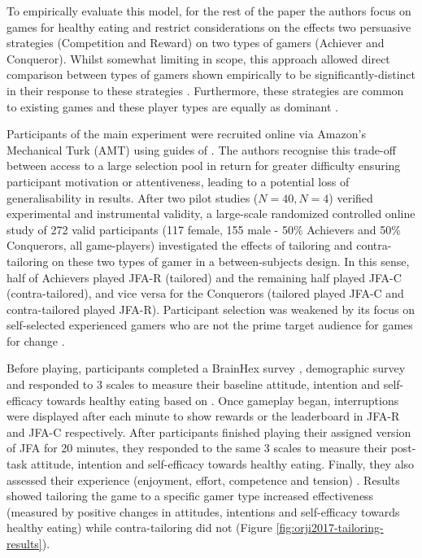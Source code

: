 \documentclass[11pt]{article}
\begin{document}
To empirically evaluate this model, for the rest of the paper the authors focus on games for healthy eating and restrict considerations on the effects two persuasive strategies (Competition and Reward) on two types of gamers (Achiever and Conqueror). Whilst somewhat limiting in scope, this approach allowed direct comparison between types of gamers shown empirically to be significantly-distinct in their response to these strategies \citep{orji2013a}. Furthermore, these strategies are common to existing games \citep{bell2006} and these player types are equally as dominant \citep{bartle1996}. 

Participants of the main experiment were recruited online via Amazon’s Mechanical Turk (AMT) using guides of \citet{mason2012}. The authors recognise this trade-off between access to a large selection pool in return for greater difficulty ensuring participant motivation or attentiveness, leading to a potential loss of generalisability in results. After two pilot studies ($N=40, N=4$) verified experimental and instrumental validity, a large-scale randomized controlled online study of 272 valid participants (117 female, 155 male - 50\% Achievers and 50\% Conquerors, all game-players) investigated the effects of tailoring and contra-tailoring on these two types of gamer in a between-subjects design. In this sense, half of Achievers played JFA-R (tailored) and the remaining half played JFA-C (contra-tailored), and vice versa for the Conquerors (tailored played JFA-C and contra-tailored played JFA-R). Participant selection was weakened by its focus on self-selected experienced gamers who are not the prime target audience for games for change \citep{brox2011}.

Before playing, participants completed a BrainHex survey \citep{nacke2014}, demographic survey and responded to 3 scales to measure their baseline attitude, intention and self-efficacy towards healthy eating based on \citet{ajzen2002}. Once gameplay began, interruptions were displayed after each minute to show rewards or the leaderboard in JFA-R and JFA-C respectively. After participants finished playing their assigned version of JFA for 20 minutes, they responded to the same 3 scales to measure their post-task attitude, intention and self-efficacy towards healthy eating. Finally, they also assessed their experience (enjoyment, effort, competence and tension) \citep{ryan2006}. Results showed tailoring the game to a specific gamer type increased effectiveness (measured by positive changes in attitudes, intentions and self-efficacy towards healthy eating) while contra-tailoring did not (Figure \ref{fig:orji2017-tailoring-results}).
\end{document}
